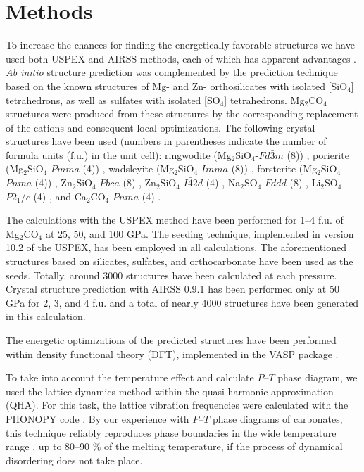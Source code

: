 \documentclass[a4paperm]{article}
\begin{document}
		\section*{Methods}

To increase the chances for finding the energetically favorable structures we have used both USPEX and AIRSS methods, each of which has apparent advantages \cite{oganov2019}.
{\it Ab initio} structure prediction was complemented by the prediction technique based on the known structures of Mg- and Zn- orthosilicates with isolated [SiO$_4$] tetrahedrons, as well as sulfates with isolated [SO$_4$] tetrahedrons. 
Mg$_2$CO$_4$ structures were produced from these structures by the corresponding replacement of the cations and consequent local optimizations.
The following crystal structures have been used (numbers in parentheses indicate the number of formula units (f.u.) in the unit cell): 
ringwodite (Mg$_2$SiO$_4$-$Fd\bar{3}m$ (8)) \cite{kanzaki2019},  
porierite (Mg$_2$SiO$_4$-$Pmma$ (4)) \cite{tomioka2021}, 
wadsleyite (Mg$_2$SiO$_4$-$Imma$ (8)) \cite{horiuchi1981}, 
forsterite (Mg$_2$SiO$_4$-$Pnma$ (4)) \cite{smyth1973},
 Zn$_2$SiO$_4$-$Pbca$ (8) \cite{kanzaki2019}, 
 Zn$_2$SiO$_4$-$I\bar{4}2d$ (4) \cite{kanzaki2019}, Na$_2$SO$_4$-$Fddd$ (8) \cite{hawthorne1975}, Li$_2$SO$_4$-$P2_1/c$ (4) \cite{alcock1973}, and Ca$_2$CO$_4$-$Pnma$ (4) \cite{sagatova2020_ortho}.

 
The calculations with the USPEX method \cite{uspex1,uspex2,uspex3,uspex_topology} have been performed for 1--4 f.u. of Mg$_2$CO$_4$ at 25, 50, and 100 GPa.
The seeding technique, implemented in version 10.2 of the USPEX, has been employed in all calculations.
The aforementioned structures based on silicates, sulfates, and orthocarbonate have been used as the seeds.
Totally, around 3000 structures have been calculated at each pressure.
Crystal structure prediction with AIRSS 0.9.1 \cite{airss1,airss2} has been performed only at 50 GPa for 2, 3, and 4 f.u. and a total of nearly 4000 structures have been generated in this calculation.

The energetic optimizations of the predicted structures have been performed within density functional theory (DFT), implemented in the VASP package \cite{vasp1,vasp2}.

To take into account the temperature effect and calculate $P$--$T$ phase diagram, we used the lattice dynamics method within the quasi-harmonic approximation (QHA).
For this task, the lattice vibration frequencies were calculated with the PHONOPY code \cite{phonopy}.
By our experience with $P$--$T$ phase diagrams of carbonates, this technique reliably reproduces phase boundaries in the wide temperature range \cite{gavr2019_alk, gavr2020_disarag, sagatova2020_ortho}, up to 80--90 \% of the melting temperature, if the process of dynamical disordering does not take place.
\end{document}
